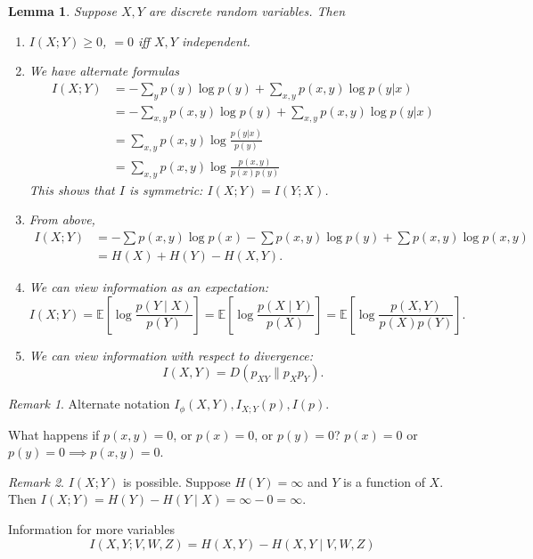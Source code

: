 \documentclass{report}
\newtheorem{lemma}{Lemma}[section]
\theoremstyle{definition}
\theoremstyle{remark}
\newtheorem*{remark}{Remark}
\numberwithin{equation}{section}
\begin{document}
\begin{lemma}
  Suppose $X, Y$ are discrete random variables. Then
  \begin{enumerate}
    \item $I(X; Y) \geq 0$, $= 0$ iff $X, Y$ independent.
    \item We have alternate formulas \begin{align*}
      I(X; Y) & = - \sum_{y} p(y) \log p(y) + \sum_{x, y} p(x, y) \log p(y|x) \\
      & = - \sum_{x, y} p(x, y) \log p(y) + \sum_{x, y} p(x, y) \log p(y|x) \\
      & = \sum_{x, y} p(x, y) \log \frac{p(y | x)}{p(y)} \\
      & = \sum_{x, y} p(x, y) \log \frac{p(x, y)}{p(x)p(y)} 
    \end{align*}
    This shows that $I$ is symmetric: $I(X; Y) = I(Y; X)$.
  
    \item From above, \begin{align*}
      I(X; Y) & = -\sum p(x, y)\log p(x) - \sum p(x, y)\log p(y) + \sum p(x, y)\log p(x, y) \\
      & = H(X) + H(Y) - H(X, Y).
    \end{align*}
  
    \item We can view information as an expectation: \[I(X; Y) = \mathbb{E}\left[\log \frac{p(Y \mid X)}{p(Y)}\right] = \mathbb{E}\left[\log \frac{p(X \mid Y)}{p(X)}\right] = \mathbb{E}\left[\log \frac{p(X, Y)}{p(X)p(Y)}\right].\]
    \item We can view information with respect to divergence: \[I(X, Y) = D(p_{XY} \| p_Xp_Y).\]
  \end{enumerate}
\end{lemma}

\begin{remark}
  Alternate notation \(
    I_\phi(X, Y), I_{X; Y}(p), I(p).  
  \)
\end{remark}

What happens if $p(x, y) = 0$, or $p(x) = 0$, or $p(y) = 0$? $p(x) = 0$ or $p(y) = 0 \implies p(x, y) = 0$.

\begin{remark}
  $I(X;Y)$ is possible. Suppose $H(Y) = \infty$ and $Y$ is a function of $X$. Then $I(X; Y) = H(Y) - H(Y \mid X) = \infty - 0 = \infty$.
\end{remark}

Information for more variables \[
  I(X, Y ; V, W, Z) = H(X,Y) - H(X,Y \mid V, W, Z)  
\]
\end{document}
